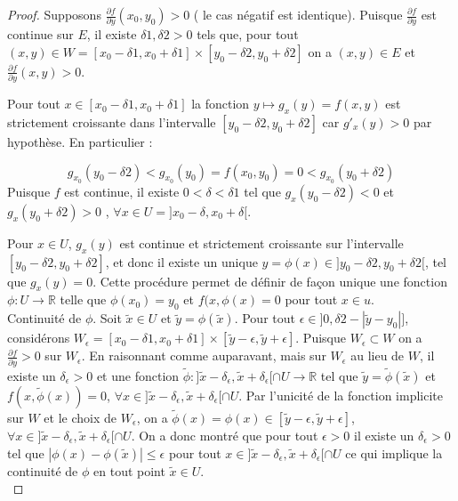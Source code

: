 \documentclass[12pt,a4paper]{amsart}
\begin{document}
\begin{proof} 
Supposons $\frac{\partial f}{\partial y}(x_{0},y_{0})>0$ ( le cas négatif est identique). Puisque $\frac{\partial f}{\partial y}$ est continue sur $E$, il existe $\delta 1, \delta 2 > 0$ tels que, pour tout $(x,y) \in W=[x_{0}-\delta 1, x_{0}+ \delta 1] \times [y_{0}-\delta 2, y_{0}+ \delta 2]$ on a $(x,y) \in E$ et $\frac{\partial f}{\partial y } (x,y) > 0$. 

Pour tout $x \in [x_{0}-\delta 1, x_{0}+ \delta 1]$ la fonction $y\mapsto g_{x}(y)=f(x,y)$ est strictement croissante dans l'intervalle $[y_{0}-\delta 2, y_{0}+ \delta 2]$ car $g'_{x}(y) >0$ par hypothèse. En particulier : 

$$g_{x_{0}}(y_{0}-\delta 2)< g_{x_{0}}(y_{0}) =f(x_{0}, y_{0})=0<g_{x_{0}}(y_{0}+\delta 2)$$
Puisque $f$ est continue, il existe $0<\delta < \delta 1$ tel que $g_{x}(y_{0}-\delta 2)<0$ et $g_{x}(y_{0}+\delta 2)>0$ , $\forall x \in U=]x_{0}-\delta, x_{0}+\delta[$. 

Pour $x \in U $, $g_{x}(y)$ est continue et strictement croissante sur l'intervalle $[y_{0}-\delta 2, y_{0}+ \delta 2]$, et donc il existe un unique $y= \phi(x) \in ]y_{0}-\delta 2, y_{0}+ \delta 2[$, tel que $ g_{x}(y)=0$. Cette procédure permet de définir de façon unique une fonction $\phi : U \rightarrow \mathbb{R} $ telle que $\phi(x_{0})= y_{0}$ et $ f(x,\phi(x)=0$ pour tout $x\in u$. \\

Continuité de $\phi$. Soit $ \tilde{x}
\in U $ et $\tilde{y} = \phi(\tilde{x })$. Pour tout $\epsilon \in ]0, \delta 2-|\tilde{y}-y_{0}|]$, considérons $W_{\epsilon}=[x_{0}-\delta 1, x_{0}+ \delta 1] \times [\tilde{y} -\epsilon, \tilde{y}+ \epsilon]$. Puisque $W_{\epsilon }\subset W$ on a $\frac{\partial f}{\partial y} > 0 $ sur $W_{\epsilon}$. En raisonnant comme auparavant, mais sur $W_{\epsilon}$ au lieu de $W $, il existe un $\delta_{\epsilon} >0$ et une fonction $\tilde{\phi} : ]\tilde{x}-\delta_{\epsilon},\tilde{x}+\delta_{\epsilon}[\cap U \rightarrow \mathbb{R}$ tel que $\tilde{y}=\tilde{\phi}(\tilde{x})$ et $f(x,\tilde{\phi}(x))=0$, $\forall x \in  ]\tilde{x}-\delta_{\epsilon},\tilde{x}+\delta_{\epsilon}[\cap U$. Par l'unicité de la fonction implicite sur $W$ et le choix de $W_{\epsilon}$, on a $\tilde{\phi}(x)=\phi(x) \in  [\tilde{y} -\epsilon, \tilde{y}+ \epsilon]$, $\forall x \in ]\tilde{x}-\delta_{\epsilon},\tilde{x}+\delta_{\epsilon}[\cap U$. On a donc montré que pour tout $\epsilon >0$ il existe un $\delta_{\epsilon} >0$ tel que $|\phi(x)-\phi(\tilde{x})| \leq \epsilon$ pour tout $ x \in ]\tilde{x}-\delta_{\epsilon},\tilde{x}+\delta_{\epsilon}[\cap U$ ce qui implique la continuité de $\phi$ en tout point $\tilde{x} \in U$. \\


\end{proof}
\end{document}
